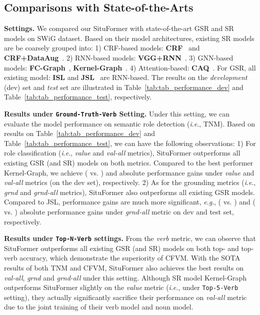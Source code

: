 \documentclass[letterpaper]{article} \usepackage{aaai22}  \usepackage{times}  \usepackage{helvet}  \usepackage{courier}  \usepackage[hyphens]{url}  \usepackage{graphicx} \urlstyle{rm} \def\UrlFont{\rm}  \usepackage{natbib}  \usepackage{caption} \DeclareCaptionStyle{ruled}{labelfont=normalfont,labelsep=colon,strut=off} \frenchspacing  \setlength{\pdfpagewidth}{8.5in}  \setlength{\pdfpageheight}{11in}
\newcommand{\ie}{\textit{i}.\textit{e}.}
\newcommand{\eg}{\textit{e}.\textit{g}.}
\begin{document}
\subsection{Comparisons with State-of-the-Arts}
\noindent\textbf{Settings.} We compared our SituFormer with state-of-the-art GSR and SR models on SWiG dataset. Based on their model architectures, existing SR models are be coarsely grouped into: 1) CRF-based models: \textbf{CRF}~\cite{yatskar2016situation} and \textbf{CRF+DataAug}~\cite{yatskar2017commonly}. 2) RNN-based models: \textbf{VGG+RNN}~\cite{mallya2017recurrent}. 3) GNN-based models: \textbf{FC-Graph}~\cite{li2017situation}, \textbf{Kernel-Graph}~\cite{suhail2019mixture}. 4) Attention-based: \textbf{CAQ}~\cite{9156513}. For GSR, all existing model: \textbf{ISL} and \textbf{JSL}~\cite{pratt2020grounded} are RNN-based. The results on the \textit{development} (dev) set and \emph{test} set are illustrated in Table~\ref{tab:tab_performance_dev} and Table~\ref{tab:tab_performance_test}, respectively. 


\noindent\textbf{Results under \texttt{Ground-Truth-Verb} Setting.} Under this setting, we can evaluate the model performance on semantic role detection (\ie, TNM). Based on results on Table~\ref{tab:tab_performance_dev} and Table~\ref{tab:tab_performance_test}, we can have the following observations: 1) For role classification (\ie, \emph{value} and \emph{val-all} metrics), SituFormer outperforms all existing GSR (and SR) models on both metrics. Compared to the best performer Kernel-Graph, we achieve  ( vs. ) and  absolute performance gains under \emph{value} and \emph{val-all} metrics (on the dev set), respectively. 2) As for the grounding metrics (\ie, \emph{grnd} and \emph{grnd-all} metrics), SituFormer also outperforms all existing GSR models. Compared to JSL, performance gains are much more significant, \eg,  ( vs. ) and  ( vs. ) absolute performance gains under \emph{grnd-all} metric on dev and test set, respectively. 



\noindent\textbf{Results under \texttt{Top-N-Verb} settings.} From the \emph{verb} metric, we can observe that SituFormer outperforms all existing GSR (and SR) models on both top- and top- verb accuracy, which demonstrate the superiority of CFVM. With the SOTA results of both TNM and CFVM, SituFormer also achieves the best results on \emph{val-all}, \emph{grnd} and \emph{grnd-all} under this setting. Although SR model Kernel-Graph outperforms SituFormer slightly on the \textit{value} metric (\ie,  under \texttt{Top-5-Verb} setting), they actually significantly sacrifice their performance on \textit{val-all} metric due to the joint training of their verb model and noun model.
\end{document}
